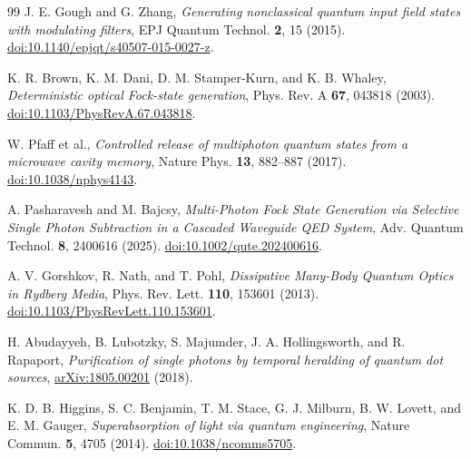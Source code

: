 \documentclass[11pt,a4paper]{article}
\begin{document}
\begin{thebibliography}{99}
J. E. Gough and G. Zhang, \emph{Generating nonclassical quantum
input field states with modulating filters}, EPJ Quantum Technol.
\textbf{2}, 15 (2015).
\href{https://doi.org/10.1140/epjqt/s40507-015-0027-z}
{doi:10.1140/epjqt/s40507-015-0027-z}.

K. R. Brown, K. M. Dani, D. M. Stamper-Kurn, and K. B. Whaley,
\emph{Deterministic optical Fock-state generation},
Phys. Rev. A \textbf{67}, 043818 (2003).
\href{https://doi.org/10.1103/PhysRevA.67.043818}
{doi:10.1103/PhysRevA.67.043818}.

W. Pfaff et al., \emph{Controlled release of multiphoton quantum
states from a microwave cavity memory}, Nature Phys. \textbf{13},
882--887 (2017).
\href{https://doi.org/10.1038/nphys4143}{doi:10.1038/nphys4143}.

A. Pasharavesh and M. Bajcsy, \emph{Multi-Photon Fock State
Generation via Selective Single Photon Subtraction in a Cascaded
Waveguide QED System}, Adv. Quantum Technol. \textbf{8}, 2400616
(2025). \href{https://doi.org/10.1002/qute.202400616}
{doi:10.1002/qute.202400616}.

A. V. Gorshkov, R. Nath, and T. Pohl, \emph{Dissipative Many-Body
Quantum Optics in Rydberg Media}, Phys. Rev. Lett. \textbf{110},
153601 (2013).
\href{https://doi.org/10.1103/PhysRevLett.110.153601}
{doi:10.1103/PhysRevLett.110.153601}.

H. Abudayyeh, B. Lubotzky, S. Majumder, J. A. Hollingsworth, and
R. Rapaport, \emph{Purification of single photons by temporal
heralding of quantum dot sources},
\href{https://arxiv.org/abs/1805.00201}{arXiv:1805.00201} (2018).

K. D. B. Higgins, S. C. Benjamin, T. M. Stace, G. J. Milburn,
B. W. Lovett, and E. M. Gauger, \emph{Superabsorption of light via
quantum engineering}, Nature Commun. \textbf{5}, 4705 (2014).
\href{https://doi.org/10.1038/ncomms5705}{doi:10.1038/ncomms5705}.
\end{thebibliography}
\end{document}
